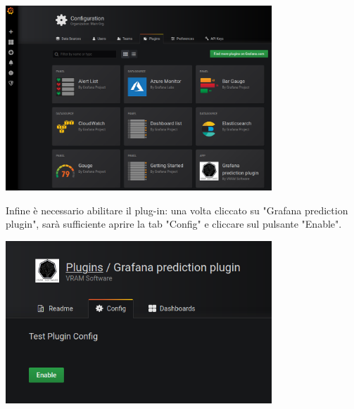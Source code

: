 \begin{center}
	\includegraphics[width=10cm]{img/inserimento-plugin2.png}
\end{center}

Infine è necessario abilitare il plug-in: una volta cliccato su "Grafana prediction plugin", sarà sufficiente aprire la tab "Config" e cliccare sul pulsante "Enable".

\begin{center}
	\includegraphics[width=10cm]{img/inserimento-plugin3.png}
\end{center}
